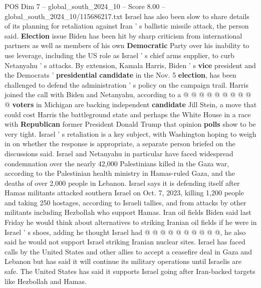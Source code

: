 \begin{textsample}{POS Dim 7 – global\_south\_2024\_10 – Score 8.00 – global\_south\_2024\_10/115686217.txt}
Israel has also been slow to share details of its planning for retaliation against Iran ' s ballistic missile attack, the person said. \textbf{Election} issue Biden has been hit by sharp criticism from international partners as well as members of his own \textbf{Democratic} Party over his inability to use leverage, including the US role as Israel ' s chief arms supplier, to curb Netanyahu ' s attacks.
By extension, Kamala Harris, Biden ' s \textbf{vice} president and the Democrats ' \textbf{presidential} \textbf{candidate} in the Nov. 5 \textbf{election}, has been challenged to defend the administration ' s policy on the campaign trail.
Harris joined the call with Biden and Netanyahu, according to a @ @ @ @ @ @ @ @ @ @ \textbf{voters} in Michigan are backing independent \textbf{candidate} Jill Stein, a move that could cost Harris the battleground state and perhaps the White House in a race with \textbf{Republican} former President Donald Trump that opinion \textbf{polls} show to be very tight.
Israel ' s retaliation is a key subject, with Washington hoping to weigh in on whether the response is appropriate, a separate person briefed on the discussions said.
Israel and Netanyahu in particular have faced widespread condemnation over the nearly 42,000 Palestinians killed in the Gaza war, according to the Palestinian health ministry in Hamas-ruled Gaza, and the deaths of over 2,000 people in Lebanon.
Israel says it is defending itself after Hamas militants attacked southern Israel on Oct. 7, 2023, killing 1,200 people and taking 250 hostages, according to Israeli tallies, and from attacks by other militants including Hezbollah who support Hamas.
Iran oil fields Biden said last Friday he would think about alternatives to striking Iranian oil fields if he were in Israel ' s shoes, adding he thought Israel had @ @ @ @ @ @ @ @ @ @, he also said he would not support Israel striking Iranian nuclear sites.
Israel has faced calls by the United States and other allies to accept a ceasefire deal in Gaza and Lebanon but has said it will continue its military operations until Israelis are safe.
The United States has said it supports Israel going after Iran-backed targets like Hezbollah and Hamas.

\end{textsample}
